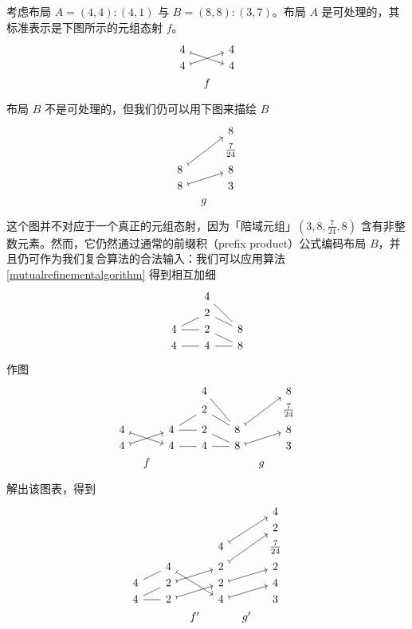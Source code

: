 考虑布局 $A = (4,4):(4,1)$ 与 $B = (8,8):(3,7)$。布局 $A$ 是可处理的，其标准表示是下图所示的元组态射 $f$。
\[ \begin{tikzcd} [row sep = 1, column sep = 8]
4 \ar[drr,mapsto] & & 4\\
4 \ar[urr,mapsto] & & 4\\
 & f & \\
\end{tikzcd} \]
布局 $B$ 不是可处理的，但我们仍可以用下图来描绘 $B$
\[ \begin{tikzcd} [row sep = 1, column sep = 8]
 & & 8\\
 & & \frac{7}{24}\\
8 \ar[uurr,mapsto] & & 8 \\
8 \ar[urr,mapsto] & & 3\\
  &g& \\
\end{tikzcd} \]
这个图并不对应于一个真正的元组态射，因为「陪域元组」$(3,8,\frac{7}{24},8) $ 含有非整数元素。然而，它仍然通过通常的前缀积（prefix product）公式编码布局 $B$，并且仍可作为我们复合算法的合法输入：我们可以应用算法 \ref{mutualrefinementalgorithm} 得到相互加细
\[ \begin{tikzcd} [row sep = 1, column sep = 8]
 & & 4 & & \\
 & & 2 & & \\
4 \ar[rr,-] \ar[urr,-] & & 2 & & \ar[llu,-] \ar[lluu,-] 8\\
4 \ar[rr,-] & & 4 & & \ar[ll,-] \ar[llu,-] 8\\
\end{tikzcd} \]
作图
\[ \begin{tikzcd} [row sep = 1, column sep = 8]
& & & & 4 & & & &  8\\
& & & & 2 & & & & \frac{7}{24}\\
4 \ar[drr,mapsto] & & 4 \ar[rr,-] \ar[urr,-] & & 2 & & \ar[llu,-] \ar[lluu,-] 8 \ar[uurr,mapsto] & & 8 \\
4 \ar[urr,mapsto] & & 4 \ar[rr,-] & & 4 & & \ar[ll,-] \ar[llu,-] 8 \ar[urr,mapsto] & & 3\\
& f & & & & & & g & \\
\end{tikzcd} \]
解出该图表，得到
\[ \begin{tikzcd} [row sep = 1, column sep = 8]
 & & & & & & 4 \\
 & & & & & & 2 \\
 & & & & 4 \ar[uurr,mapsto] & & \frac{7}{24} \\
 & & 4 \ar[ddrr,mapsto] & & 2 \ar[uurr,mapsto] & & 2 \\
4 \ar[urr,-] & & 2 \ar[urr,mapsto] & & 2 \ar[urr,mapsto] & & 4\\
4 \ar[rr,-] \ar[urr,-] & & 2 \ar[urr,mapsto] & & 4 \ar[urr,mapsto] & & 3 \\
 & & & f' & & g' & \\
\end{tikzcd} \]
